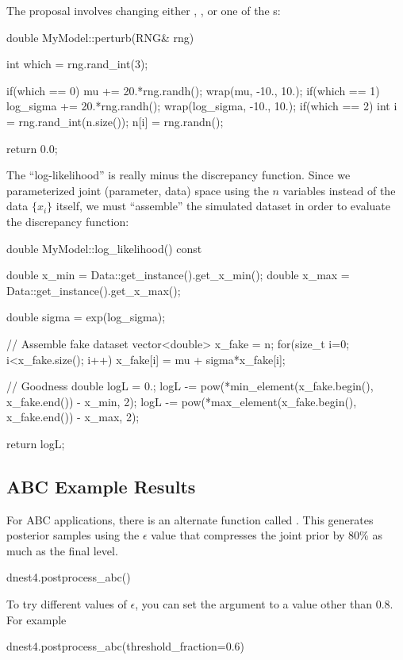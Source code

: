 \documentclass[article, nojss]{jss}
\begin{document}
The proposal involves changing either , , or
one of the s:
\begin{CodeChunk}
\begin{CodeInput}
double MyModel::perturb(RNG& rng)
{
    int which = rng.rand_int(3);

    if(which == 0)
    {
        mu += 20.*rng.randh();
        wrap(mu, -10., 10.);
    }
    if(which == 1)
    {
        log_sigma += 20.*rng.randh();
        wrap(log_sigma, -10., 10.);
    }
    if(which == 2)
    {
        int i = rng.rand_int(n.size());
        n[i] = rng.randn();
    }

    return 0.0;
}
\end{CodeInput}
\end{CodeChunk}

The ``log-likelihood'' is really minus the discrepancy function.
Since we parameterized joint (parameter, data) space using the
$n$ variables instead of the data $\{x_i\}$ itself, we must
``assemble'' the simulated dataset in order to evaluate the
discrepancy function:
\begin{CodeChunk}
\begin{CodeInput}
double MyModel::log_likelihood() const
{
    double x_min = Data::get_instance().get_x_min();
    double x_max = Data::get_instance().get_x_max();

    double sigma = exp(log_sigma);

    // Assemble fake dataset
    vector<double> x_fake = n;
    for(size_t i=0; i<x_fake.size(); i++)
        x_fake[i] = mu + sigma*x_fake[i];

    // Goodness
    double logL = 0.;
    logL -= pow(*min_element(x_fake.begin(), x_fake.end()) - x_min, 2);
    logL -= pow(*max_element(x_fake.begin(), x_fake.end()) - x_max, 2);

    return logL;
}
\end{CodeInput}
\end{CodeChunk}

\subsection{ABC Example Results}
For ABC applications, there is an alternate  function
called .
This generates posterior samples using the $\epsilon$ value that
compresses the joint prior by 80\% as much as the final level.
\begin{CodeChunk}
\begin{CodeInput}
dnest4.postprocess_abc()
\end{CodeInput}
\end{CodeChunk}
To try different values of $\epsilon$, you can set the argument
 to a value other than 0.8. For example
\begin{CodeChunk}
\begin{CodeInput}
dnest4.postprocess_abc(threshold_fraction=0.6)
\end{CodeInput}
\end{CodeChunk}
\end{document}
